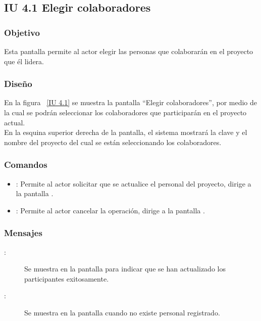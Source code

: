\newpage 
\newpage 
\subsection{IU 4.1 Elegir colaboradores}
\subsubsection{Objetivo}
	
		Esta pantalla permite al actor elegir las personas que colaborarán en el proyecto que él lidera.

\subsubsection{Diseño}

    En la figura ~\ref{IU 4.1} se muestra la pantalla ``Elegir colaboradores'', por medio de la cual 
    se podrán seleccionar los colaboradores que participarán en el proyecto actual. \\
	
	En la esquina superior derecha de la pantalla, el sistema mostrará la clave y el nombre del proyecto del cual se están seleccionando los colaboradores.
	
    


\subsubsection{Comandos}
\begin{itemize}
		\item {}: Permite al actor solicitar que se actualice el personal del proyecto, dirige a la pantalla .
		\item {}: Permite al actor cancelar la operación, dirige a la pantalla .
\end{itemize}
\subsubsection{Mensajes}
	
\begin{description}
	\item[:] Se muestra en la pantalla  para indicar que se han actualizado los participantes exitosamente.
	\item[:] Se muestra en la pantalla  cuando no existe personal registrado.
\end{description}
